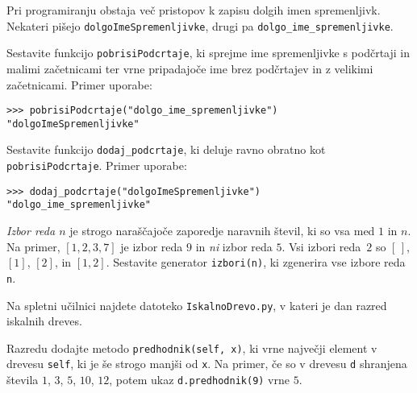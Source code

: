 \documentclass[arhiv]{izpit}
\begin{document}

\naloga[25 točk]

Pri programiranju obstaja več pristopov k zapisu dolgih imen
spremenljivk. Nekateri pišejo \verb|dolgoImeSpremenljivke|, drugi pa
\verb|dolgo_ime_spremenljivke|.
  
\podnaloga
%
Sestavite funkcijo \verb|pobrisiPodcrtaje|, ki sprejme ime
spremenljivke s podčrtaji in malimi začetnicami ter vrne pripadajoče
ime brez podčrtajev in z velikimi začetnicami. Primer uporabe:
%
\begin{verbatim}
>>> pobrisiPodcrtaje("dolgo_ime_spremenljivke")
"dolgoImeSpremenljivke"
\end{verbatim}

  
\podnaloga
%
Sestavite funkcijo \verb|dodaj_podcrtaje|, ki deluje ravno obratno kot
\verb|pobrisiPodcrtaje|. Primer uporabe:
\begin{verbatim}
>>> dodaj_podcrtaje("dolgoImeSpremenljivke")
"dolgo_ime_spremenljivke"
\end{verbatim}



\naloga[25 točk]

\emph{Izbor reda $n$} je strogo naraščajoče zaporedje naravnih števil,
ki so vsa med $1$ in $n$. Na primer, $[1,2,3,7]$ je izbor reda $9$ in
\emph{ni} izbor reda $5$. Vsi izbori reda~$2$ so $[\,]$, $[1]$, $[2]$,
in $[1,2]$.
%
Sestavite generator \verb|izbori(n)|, ki zgenerira vse izbore reda \verb|n|.


\naloga[25 točk]

Na spletni učilnici najdete datoteko \verb|IskalnoDrevo.py|, v kateri
je dan razred iskalnih dreves.

\podnaloga
%
Razredu dodajte metodo
\verb|predhodnik(self, x)|, ki vrne največji element v drevesu
\verb|self|, ki je še strogo manjši od \verb|x|. Na primer, če so v drevesu
\verb|d| shranjena števila $1$, $3$, $5$, $10$, $12$, potem ukaz
\verb|d.predhodnik(9)| vrne $5$.
\end{document}
